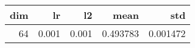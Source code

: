 \begin{tabular}{rrrrr}
\toprule
 dim &     lr &     l2 &      mean &       std \\
\midrule
  64 &  0.001 &  0.001 &  0.493783 &  0.001472 \\
\bottomrule
\end{tabular}
